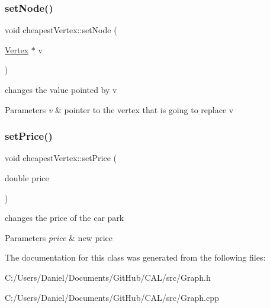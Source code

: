 \subsubsection{\texorpdfstring{set\+Node()}{setNode()}}
{\footnotesize\ttfamily void cheapest\+Vertex\+::set\+Node (\begin{DoxyParamCaption}\item[{\hyperlink{class_vertex}{Vertex} $\ast$}]{v }\end{DoxyParamCaption})}



changes the value pointed by v 


\begin{DoxyParams}{Parameters}
{\em v} & pointer to the vertex that is going to replace v \\
\hline
\end{DoxyParams}
\hypertarget{classcheapest_vertex_ae8868f73f3bf298959e61fa667553c9e}{}\label{classcheapest_vertex_ae8868f73f3bf298959e61fa667553c9e} 
\subsubsection{\texorpdfstring{set\+Price()}{setPrice()}}
{\footnotesize\ttfamily void cheapest\+Vertex\+::set\+Price (\begin{DoxyParamCaption}\item[{double}]{price }\end{DoxyParamCaption})}



changes the price of the car park 


\begin{DoxyParams}{Parameters}
{\em price} & new price \\
\hline
\end{DoxyParams}


The documentation for this class was generated from the following files\+:\begin{DoxyCompactItemize}
\item 
C\+:/\+Users/\+Daniel/\+Documents/\+Git\+Hub/\+C\+A\+L/src/Graph.\+h\item 
C\+:/\+Users/\+Daniel/\+Documents/\+Git\+Hub/\+C\+A\+L/src/Graph.\+cpp\end{DoxyCompactItemize}

